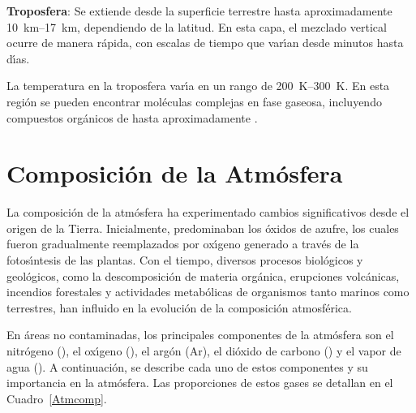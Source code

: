 \textbf{Troposfera}: Se extiende desde la superficie terrestre hasta aproximadamente \SIrange{10}{17}{\kilo\metre}, dependiendo de la latitud. En esta capa, el mezclado vertical ocurre de manera r\'apida, con escalas de tiempo que var\'{\i}an desde minutos hasta d\'{\i}as.  

La temperatura en la troposfera var\'{\i}a en un rango de \SIrange{200}{300}{\kelvin}. En esta regi\'on se pueden encontrar mol\'eculas complejas en fase gaseosa, incluyendo compuestos org\'anicos de hasta aproximadamente .

  \section{Composici\'on de la Atm\'osfera}
   \label{catmos}

La composici\'on de la atm\'osfera ha experimentado cambios significativos desde el origen de la Tierra. Inicialmente, predominaban los \'oxidos de azufre, los cuales fueron gradualmente reemplazados por ox\'{\i}geno generado a trav\'es de la fotos\'{\i}ntesis de las plantas. Con el tiempo, diversos procesos biol\'ogicos y geol\'ogicos, como la descomposici\'on de materia org\'anica, erupciones volc\'anicas, incendios forestales y actividades metab\'olicas de organismos tanto marinos como terrestres, han influido en la evoluci\'on de la composici\'on atmosf\'erica.

En \'areas no contaminadas, los principales componentes de la atm\'osfera son el nitr\'ogeno (), el ox\'{\i}geno (), el arg\'on (Ar), el di\'oxido de carbono () y el vapor de agua (). A continuaci\'on, se describe cada uno de estos componentes y su importancia en la atm\'osfera. Las proporciones de estos gases se detallan en el Cuadro~\ref{Atmcomp}.

